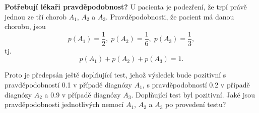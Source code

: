\begin{mdframed}[style=mdexam]
  \begin{example}\label{mai:exam061}
    \textbf{Potřebují lékaři pravděpodobnost?}\newline
    U pacienta je podezření, že trpí právě jednou ze tří chorob \(A_1\), \(A_2\) a \(A_3\).
    Pravděpodobnosti, že pacient má danou chorobu, jsou
    \begin{equation*}
      p(A_1) = \frac{1}{2},\; p(A_2) = \frac{1}{6},\; p(A_3) = \frac{1}{3},
    \end{equation*}
    tj.
    \begin{equation*}
      p(A_1) + p(A_2) + p(A_3) = 1.
    \end{equation*}
    
    Proto je předepsán ještě doplňující test, jehož výsledek bude pozitivní s pravděpodobností
    \num{0.1} v případě diagnózy \(A_1\), s pravděpodobností \num{0.2} v případě diagnózy \(A_2\) a
    \num{0.9} v případě diagnózy \(A_3\). Doplňující test byl pozitivní. Jaké jsou pravděpodobnosti
    jednotlivých nemocí \(A_1\), \(A_2\) a \(A_3\) po provedení testu?


\end{example}
\end{mdframed}
